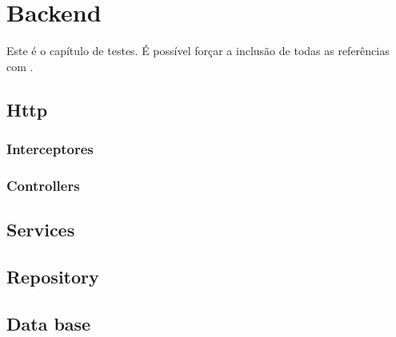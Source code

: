 \chapter{Backend} \label{cap:backend}

Este é o capítulo de testes. 
É possível forçar a inclusão de todas as referências com \cite{*}.

\section{Http}

\subsection{Interceptores}

\subsection{Controllers}

\section{Services}

\section{Repository}

\section{Data base}